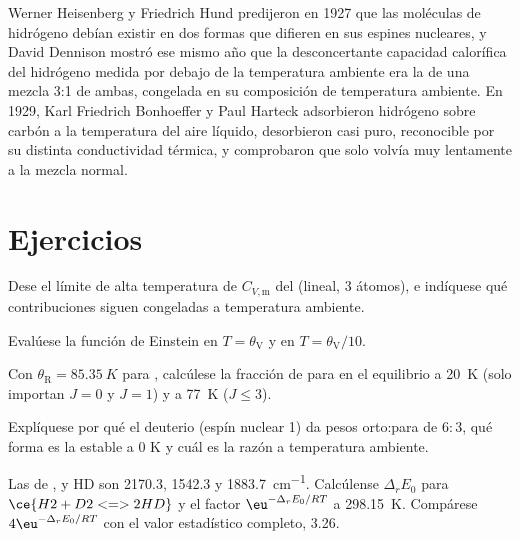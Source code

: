 \begin{history}
Werner Heisenberg y Friedrich Hund predijeron en 1927 que las moléculas de hidrógeno
debían existir en dos formas que difieren en sus espines nucleares, y David Dennison
mostró ese mismo año que la desconcertante capacidad calorífica del hidrógeno medida
por debajo de la temperatura ambiente era la de una mezcla 3:1 de ambas, congelada en su
composición de temperatura ambiente. En 1929, Karl Friedrich Bonhoeffer y Paul
Harteck adsorbieron hidrógeno sobre carbón a la temperatura del aire líquido, desorbieron
 casi puro, reconocible por su distinta conductividad térmica,
y comprobaron que solo volvía muy lentamente a la mezcla normal.
\end{history}

\section{Ejercicios}

\begin{exercise}[$\star$]\label{exo:b3:statistical-thermo-applied:1}
Dese el límite de alta temperatura de $C_{V,\mathrm m}$ del  (lineal, 3 átomos), e indíquese
qué contribuciones siguen congeladas a temperatura ambiente.
\end{exercise}

\begin{exercise}[$\star$]\label{exo:b3:statistical-thermo-applied:2}
Evalúese la función de Einstein en $T = \theta_{\mathrm V}$ y en $T = \theta_{\mathrm V}/10$.
\end{exercise}

\begin{exercise}[$\star$]\label{exo:b3:statistical-thermo-applied:3}
Con $\theta_{\mathrm R} = \qty{85.35}{K}$ para , calcúlese la fracción de para en el equilibrio a
\qty{20}{K} (solo importan $J = 0$ y $J = 1$) y a \qty{77}{K} ($J \le 3$).
\end{exercise}

\begin{exercise}[$\star$]\label{exo:b3:statistical-thermo-applied:4}
Explíquese por qué el deuterio (espín nuclear 1) da pesos orto:para de $6 : 3$, qué
forma es la estable a 0 K y cuál es la razón a temperatura ambiente.
\end{exercise}

\begin{exercise}[$\star\star$]\label{exo:b3:statistical-thermo-applied:5}
Las  de ,  y HD son 2170.3, 1542.3 y
\qty{1883.7}{cm^{-1}}. Calcúlense $\Delta_rE_0$ para $\ce{H2 + D2 <=> 2 HD}$ y el factor $\eu^{-\Delta_rE_0/RT}$ a
\qty{298.15}{K}. Compárese $4\eu^{-\Delta_rE_0/RT}$ con el valor estadístico completo, 3.26.
\end{exercise}

